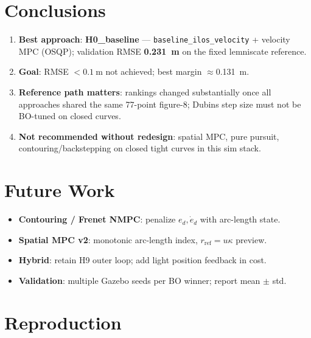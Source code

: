 \documentclass[11pt,a4paper]{article}
\begin{document}
\section{Conclusions}
\label{sec:conclusions}

\begin{enumerate}
  \item \textbf{Best approach}: \textbf{H0\_baseline} ---
        \texttt{baseline\_ilos\_velocity} + velocity MPC (OSQP);
        validation RMSE \textbf{\SI{0.231}{\meter}} on the fixed lemniscate reference.
  \item \textbf{Goal}: RMSE $< \SI{0.1}{\meter}$ not achieved; best margin $\approx$\SI{0.131}{\meter}.
  \item \textbf{Reference path matters}: rankings changed substantially once all approaches
        shared the same 77-point figure-8; Dubins step size must not be BO-tuned on closed curves.
  \item \textbf{Not recommended without redesign}: spatial MPC, pure pursuit, contouring/backstepping
        on closed tight curves in this sim stack.
\end{enumerate}

\section{Future Work}
\label{sec:future}

\begin{itemize}
  \item \textbf{Contouring / Frenet NMPC}: penalize $e_d, \dot{e}_d$ with arc-length state.
  \item \textbf{Spatial MPC v2}: monotonic arc-length index, $r_{\mathrm{ref}}=u\kappa$ preview.
  \item \textbf{Hybrid}: retain H9 outer loop; add light position feedback in cost.
  \item \textbf{Validation}: multiple Gazebo seeds per BO winner; report mean $\pm$ std.
\end{itemize}

\appendix
\section{Reproduction}
\label{app:repro}
\end{document}

